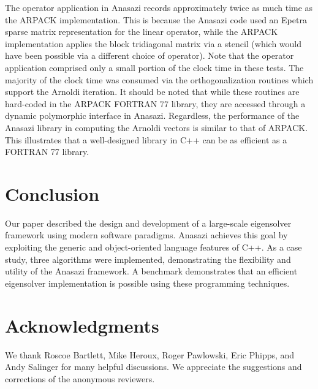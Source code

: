 \documentclass[acmtoms]{acmtrans2m}
\newcounter{algorithm}
\begin{document}
The operator application in Anasazi records approximately twice as much time as the ARPACK
implementation. This is because the Anasazi code used an Epetra sparse matrix
representation for the linear operator, while the ARPACK implementation applies the block
tridiagonal matrix via a stencil (which would have been possible via a different choice of
operator). Note that the operator application comprised only a small portion of the clock
time in these tests. The majority of the clock time was consumed via the orthogonalization
routines which support the Arnoldi iteration. It should be noted that while these routines
are hard-coded in the ARPACK FORTRAN 77 library, they are accessed through a dynamic
polymorphic interface in Anasazi. Regardless, the performance of the Anasazi library in
computing the Arnoldi vectors is similar to that of ARPACK. This illustrates that a
well-designed library in C++ can be as efficient as a FORTRAN 77 library.

\section{Conclusion}

Our paper described the design and development of a large-scale eigensolver framework
using modern software paradigms. Anasazi achieves this goal by exploiting the generic and
object-oriented language features of C++. As a case study, three algorithms were
implemented, demonstrating the flexibility and utility of the Anasazi framework. A
benchmark demonstrates that an efficient eigensolver implementation is possible using
these programming techniques. 

% 
% 
% 

\section{Acknowledgments}

We thank Roscoe Bartlett, Mike Heroux, Roger Pawlowski, Eric Phipps, and Andy Salinger for
many helpful discussions. We appreciate the suggestions and corrections of the anonymous
reviewers.





\begin{received}
\end{received}
\end{document}
